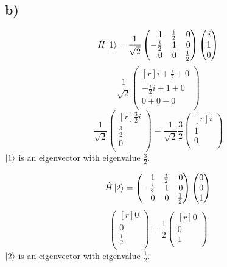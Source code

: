 \documentclass{article}
\begin{document}
\subsection*{b)}
\[
\hat{H}\ket{1} = \frac{1}{\sqrt{2}} 
\begin{pmatrix*}[r]
    1 & \frac{i}{2} & 0 \\
    -\frac{i}{2} & 1 & 0 \\
    0 & 0 & \frac{1}{2} \\
\end{pmatrix*}
\begin{pmatrix*}[r]
 i \\
 1 \\
 0 \\
\end{pmatrix*} 
\]
\[
\frac{1}{\sqrt{2}}
\begin{pmatrix*}[r]
 i + \frac{i}{2} + 0 \\
 -\frac{i}{2}i + 1 + 0 \\
 0 + 0 + 0 \\
\end{pmatrix*}
\]
\[
\frac{1}{\sqrt{2}}
\begin{pmatrix*}[r]
\frac{3}{2}i \\
\frac{3}{2} \\
0 \\
\end{pmatrix*} = \frac{1}{\sqrt{2}} \frac{3}{2}
\begin{pmatrix*}[r]
i \\
1 \\
0 \\
\end{pmatrix*}
\]
$\ket{1}$ is an eigenvector with eigenvalue $\frac{3}{2}$.

\[
\hat{H}\ket{2} = 
\begin{pmatrix*}[r]
1 & \frac{i}{2} & 0 \\
-\frac{i}{2} & 1 & 0 \\
0 & 0 & \frac{1}{2} \\
\end{pmatrix*}
\begin{pmatrix*}[r]
0 \\
0 \\
1 \\
\end{pmatrix*}
\]
\[
\begin{pmatrix*}[r]
0 \\
0 \\
\frac{1}{2} \\
\end{pmatrix*} = \frac{1}{2} 
\begin{pmatrix*}[r]
0 \\
0 \\
1 \\
\end{pmatrix*}
\]
$\ket{2}$ is an eigenvector with eigenvalue $\frac{1}{2}$.
\end{document}
